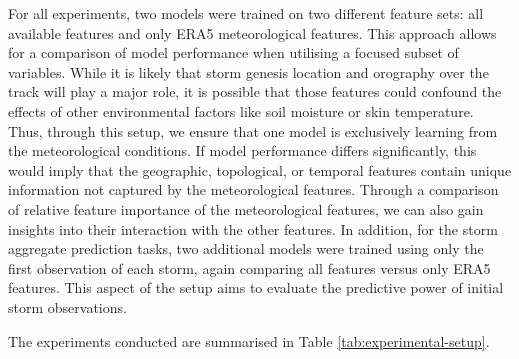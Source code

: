 For all experiments, two models were trained on two different feature sets: all available features and only ERA5 meteorological features. This approach allows for a comparison of model performance when utilising a focused subset of variables. While it is likely that storm genesis location and orography over the track will play a major role, it is possible that those features could confound the effects of other environmental factors like soil moisture or skin temperature. Thus, through this setup, we ensure that one model is exclusively learning from the meteorological conditions. If model performance differs significantly, this would imply that the geographic, topological, or temporal features contain unique information not captured by the meteorological features. Through a comparison of relative feature importance of the meteorological features, we can also gain insights into their interaction with the other features. In addition, for the storm aggregate prediction tasks, two additional models were trained using only the first observation of each storm, again comparing all features versus only ERA5 features. This aspect of the setup aims to evaluate the predictive power of initial storm observations.

The experiments conducted are summarised in Table \ref{tab:experimental-setup}.


